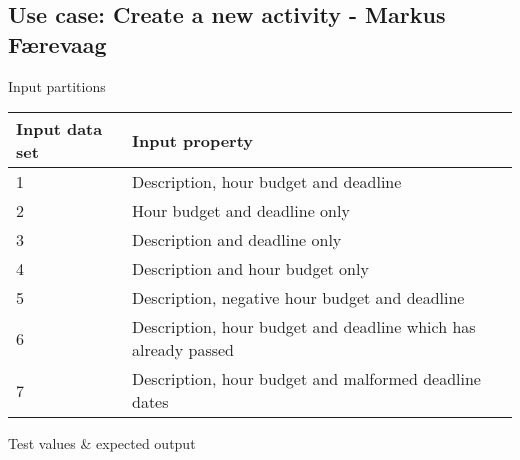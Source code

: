 \subsection{Use case: Create a new activity - Markus Færevaag}

Input partitions
\begin{center}
  \begin{tabular}{| l | l |}
    \hline
	Input data set & Input property \\ \hline
    1 & Description, hour budget and deadline \\ \hline
    2 & Hour budget and deadline only \\ \hline
    3 & Description and deadline only \\ \hline
    4 & Description and hour budget only \\ \hline
    5 & Description, negative hour budget and deadline  \\ \hline
    6 & Description, hour budget and deadline which has already passed \\ \hline
    7 & Description, hour budget and malformed deadline dates \\ \hline
  \end{tabular}
\end{center}

Test values \& expected output

